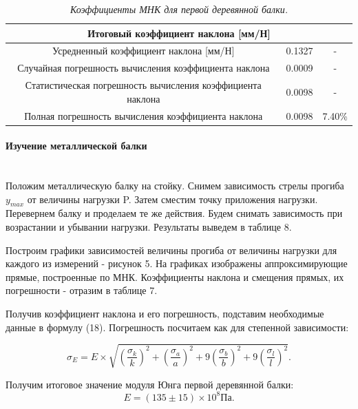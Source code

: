 \documentclass[a4paper,12pt]{report}
\begin{document}
\begin{table}[]
{\begin{tabular}{|c|l|l|c|c|}
\multicolumn{5}{|c|}{\cellcolor[HTML]{FFFFFF}\textbf{Итоговый   коэффициент наклона {[}мм/Н{]}}}                                   \\ \hline
\multicolumn{3}{|c|}{Усредненный   коэффициент наклона {[}мм/Н{]}}                 & 0.1327                & -                     \\ \hline
\multicolumn{3}{|c|}{Случайная   погрешность вычисления коэффициента наклона}      & 0.0009                & -                     \\ \hline
\multicolumn{3}{|c|}{Статистическая   погрешность вычисления коэффициента наклона} & 0.0098                & -                     \\ \hline
\multicolumn{3}{|c|}{Полная погрешность   вычисления коэффициента наклона}         & 0.0098                & 7.40\%                \\ \hline
\end{tabular}
}
\caption{\textit{Коэффициенты МНК для первой деревянной балки.}}
\end{table}

\paragraph*{Изучение металлической балки} \textbf{ }\\

Положим металлическую балку на стойку. Снимем зависимость стрелы прогиба $y_{max}$ от величины нагрузки P. Затем сместим точку приложения нагрузки. Перевернем балку и проделаем те же действия. Будем снимать зависимость при возрастании и убывании нагрузки. Результаты выведем в таблице 8.

Построим графики зависимостей величины прогиба от величины нагрузки для каждого из измерений - рисунок 5. На графиках изображены аппроксимирующие прямые, построенные по МНК. Коэффициенты наклона и смещения прямых, их погрешности - отразим в таблице 7.

Получив коэффициент наклона и его погрешность, подставим необходимые данные в формулу (18). Погрешность посчитаем как для степенной зависимости:

\[\sigma_E=E\times \sqrt{(\frac{\sigma_k}{k})^2+(\frac{\sigma_a}{a})^2+9(\frac{\sigma_b}{b})^2+9(\frac{\sigma_l}{l})^2}. \]

Получим итоговое значение модуля Юнга первой деревянной балки:
	\[E = (135\pm15)\times 10^8  \textbf{Па}. \]
	
\end{document}
